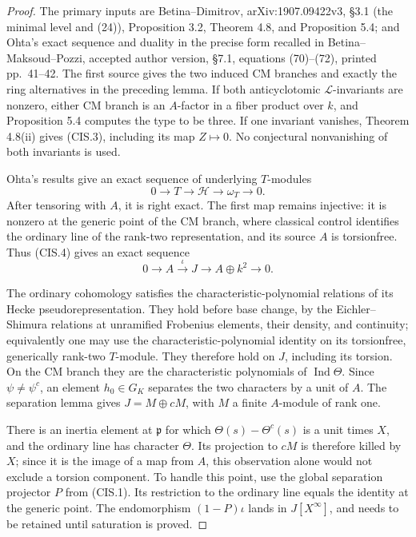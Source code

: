 \begin{proof}
The primary inputs are Betina--Dimitrov, arXiv:1907.09422v3,
\S3.1 (the minimal level and (24)), Proposition 3.2, Theorem 4.8,
and Proposition 5.4; and Ohta's exact sequence and duality in the
precise form recalled in Betina--Maksoud--Pozzi, accepted author
version, \S7.1, equations (70)--(72), printed pp.~41--42.
The first source gives the two induced CM branches and exactly the
ring alternatives in the preceding lemma.  If both
anticyclotomic \(\mathscr L\)-invariants are nonzero, either CM
branch is an \(A\)-factor in a fiber product over \(k\), and
Proposition 5.4 computes the type to be three.  If one invariant
vanishes, Theorem 4.8(ii) gives (CIS.3), including its map
\(Z\mapsto0\).  No conjectural nonvanishing of both invariants is used.

Ohta's results give an exact sequence of underlying \(T\)-modules
\[
 0\longrightarrow T\longrightarrow\mathcal H
              \longrightarrow\omega_T\longrightarrow0.        \tag{CIS.7}
\]
After tensoring with \(A\), it is right exact.  The first map remains
injective: it is nonzero at the generic point of the CM branch,
where classical control identifies the ordinary line of the
rank-two representation, and its source \(A\) is torsionfree.
Thus (CIS.4) gives an exact sequence
\[
 0\longrightarrow A\xrightarrow{\iota}J
                 \longrightarrow A\oplus k^2\longrightarrow0.  \tag{CIS.8}
\]

The ordinary cohomology satisfies the characteristic-polynomial
relations of its Hecke pseudorepresentation.  They hold before
base change, by the Eichler--Shimura relations at unramified
Frobenius elements, their density, and continuity; equivalently
one may use the characteristic-polynomial identity on its
torsionfree, generically rank-two \(T\)-module.  They therefore
hold on \(J\), including its torsion.  On the CM branch they are
the characteristic polynomials of \(\operatorname{Ind}\Theta\).
Since \(\psi\neq\psi^c\), an element \(h_0\in G_K\) separates
the two characters by a unit of \(A\).  The separation lemma gives
\(J=M\oplus cM\), with \(M\) a finite \(A\)-module of rank one.

There is an inertia element at \(\mathfrak p\) for which
\(\Theta(s)-\Theta^c(s)\) is a unit times \(X\), and the ordinary
line has character \(\Theta\).  Its projection to \(cM\) is
therefore killed by \(X\); since it is the image of a map from
\(A\), this observation alone would not exclude a torsion
component.  To handle this point, use the global separation
projector \(P\) from (CIS.1).  Its restriction to the ordinary
line equals the identity at the generic point.  The endomorphism
\((1-P)\iota\) lands in \(J[X^\infty]\), and needs to be retained
until saturation is proved.


\end{proof}

